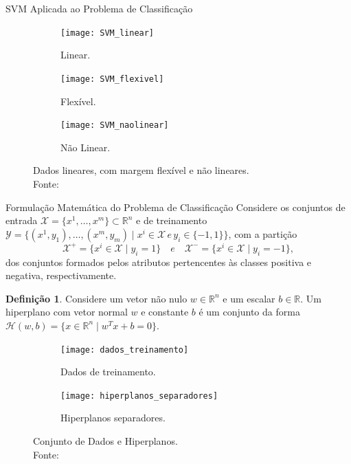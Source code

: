 \documentclass{beamer}
\def\Xset{\mathcal{X}}
\def\Yset{\mathcal{Y}}
\def\Hset{\mathcal{H}}
\def\RR{\mathds{R}}
\theoremstyle{definition}%
\newtheorem{defi}{Definição}
\begin{document}
\begin{frame}{SVM Aplicada ao Problema de Classificação}

\begin{figure}[!h] 
	\centering
	\begin{subfigure}[h]{0.3\textwidth}
		\centering
		\texttt{[image: SVM\_linear]}
		\caption{Linear. \label{fig1:a}}
	\end{subfigure}
	\begin{subfigure}[!h]{0.3\textwidth}
		\centering
		\texttt{[image: SVM\_flexivel]}
		\caption{Flexível. \label{fig1:b}}
	\end{subfigure}
	\begin{subfigure}[!h]{0.3\textwidth}
		\centering
		\texttt{[image: SVM\_naolinear]}
		\caption{Não Linear. \label{fig1:c}}
	\end{subfigure}
	\caption{Dados lineares, com margem flexível e não lineares. \label{fig1}\\ Fonte: \textcite{Evelin2017}}
\end{figure}
\end{frame}


\begin{frame}{Formulação Matemática do Problema de Classificação}
Considere os conjuntos de entrada $\Xset =\{x^1, \ldots , x^m \} \subset \RR^n$ e de treinamento $\Yset=\{(x^1, y_1), \ldots , (x^m, y_m)\mid x^i \in \Xset \, e \, y_i \in \{-1,1\}\}$, com a partição 
\[ \label{conj1}
\Xset ^{+} =\{x^i \in \Xset\mid y_i=1\} \quad e \quad \Xset^{-}=\{x^i \in \Xset\mid y_i=-1\},
\]
dos conjuntos formados pelos atributos pertencentes às classes positiva e negativa, respectivamente.

\begin{defi} Considere um vetor não nulo $w\in \RR^n$ e um escalar $b\in \RR$. Um hiperplano com vetor normal $w$ e constante $b$ é um conjunto da forma $\Hset(w,b)=\{x\in \RR^n \mid w^{T}x+b=0\}$.
\end{defi}
\end{frame}


\begin{frame}
\begin{figure}[h] 
	\centering
	\begin{subfigure}[h]{0.4\textwidth}
		\centering
		\texttt{[image: dados\_treinamento]}
		\caption{Dados de treinamento. \label{fig2:a}}
	\end{subfigure}
	\begin{subfigure}[h]{0.38\textwidth}
		\centering
		\texttt{[image: hiperplanos\_separadores]}
		\caption{Hiperplanos separadores. \label{fig2:b}}
	\end{subfigure}
	\caption{Conjunto de Dados e Hiperplanos. \label{fig2}
		\\ Fonte: \textcite{Evelin2017}}
\end{figure}
\end{frame}
\end{document}
